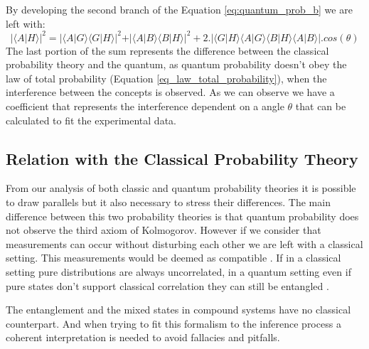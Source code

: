 By developing the second branch of the Equation \eqref{eq:quantum_prob_b} we are left with:
 \begin{equation}
\label{eq:quantum_prob_b2}
\vert \langle A \vert H\rangle \vert ^{2} = \vert 
 \langle A \vert G\rangle\langle G \vert H\rangle\vert^{2}  + \vert \langle A \vert B\rangle\langle B \vert H\rangle \vert^{2} + 2.\vert \langle G\vert H\rangle \langle A \vert G \rangle \langle B \vert H \rangle \langle A \vert B \rangle \vert .cos(\theta)
\end{equation}
The last portion of the sum represents the difference between the classical probability theory and the quantum, as quantum probability doesn't obey the law of total probability (Equation \eqref{eq_law_total_probability}), when the interference between the concepts is observed. As we can observe we have a coefficient that represents the interference dependent on a angle $\theta$ that can be calculated to fit the experimental data. 



\subsection{Relation with the Classical Probability Theory}
\label{subsec:relation}

From our analysis of both classic and quantum probability theories it is possible to draw parallels but it also necessary to stress their differences. The main difference between this two probability theories is that quantum probability does not observe the third axiom of Kolmogorov\cite{Summers2006}\cite{Caves2001}. However if we consider that measurements can occur without disturbing each other we are left with a classical setting. This measurements would be deemed as compatible \cite{Busemeyer}. If in a classical setting pure distributions are always uncorrelated, in a quantum setting even if pure states don't support classical correlation they can still be entangled \cite{Rieffel2011}. 

The 
entanglement and the mixed states in compound systems have no classical counterpart. And when trying to fit this formalism to the inference process a coherent interpretation is needed to avoid fallacies and pitfalls.  
























